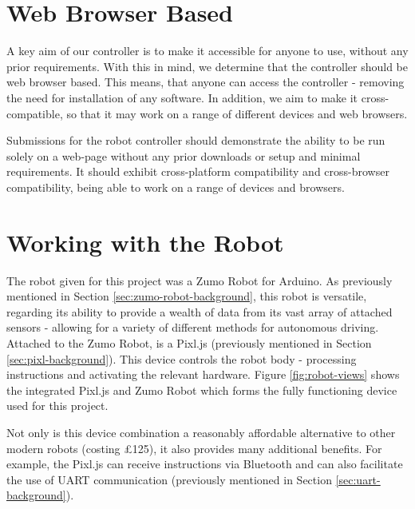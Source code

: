 \documentclass{l4proj}
\begin{document}
\section{Web Browser Based}
A key aim of our controller is to make it accessible for anyone to use, without any prior requirements. With this in mind, we determine that the controller should be web browser based. This means, that anyone can access the controller - removing the need for installation of any software. In addition, we aim to make it cross-compatible, so that it may work on a range of different devices and web browsers.

Submissions for the robot controller should demonstrate the ability to be run solely on a web-page without any prior downloads or setup and minimal requirements. It should exhibit cross-platform compatibility and cross-browser compatibility, being able to work on a range of devices and browsers.

\section{Working with the Robot}\label{sec:working-with-robot}
The robot given for this project was a Zumo Robot for Arduino. As previously mentioned in Section \ref{sec:zumo-robot-background}, this robot is versatile, regarding its ability to provide a wealth of data from its vast array of attached sensors - allowing for a variety of different methods for autonomous driving. Attached to the Zumo Robot, is a Pixl.js (previously mentioned in Section \ref{sec:pixl-background}). This device controls the robot body - processing instructions and activating the relevant hardware. Figure \ref{fig:robot-views} shows the integrated Pixl.js and Zumo Robot which forms the fully functioning device used for this project.

Not only is this device combination a reasonably affordable alternative to other modern robots (costing £125), it also provides many additional benefits. For example, the Pixl.js can receive instructions via Bluetooth and can also facilitate the use of UART communication (previously mentioned in Section \ref{sec:uart-background}).
\end{document}
